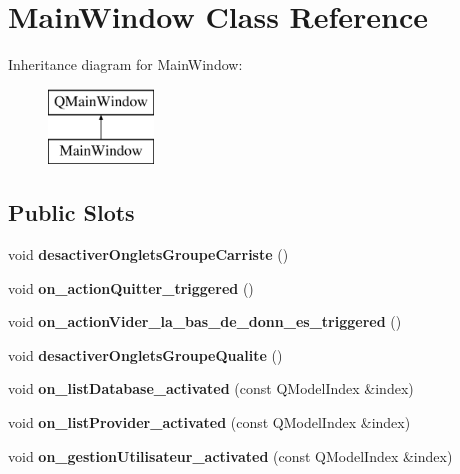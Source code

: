 \hypertarget{class_main_window}{}\section{Main\+Window Class Reference}
\label{class_main_window}
Inheritance diagram for Main\+Window\+:\begin{figure}[H]
\begin{center}
\leavevmode
\includegraphics[height=2.000000cm]{class_main_window}
\end{center}
\end{figure}
\subsection*{Public Slots}
\begin{DoxyCompactItemize}
\item 
\mbox{\label{class_main_window_a5b477f0785cfed5fdffcda39ad7b92cb}} 
void {\bfseries desactiver\+Onglets\+Groupe\+Carriste} ()
\item 
\mbox{\label{class_main_window_afe9d9d46e61e2460e636619577a9e8fd}} 
void {\bfseries on\+\_\+action\+Quitter\+\_\+triggered} ()
\item 
\mbox{\label{class_main_window_af416c87932d9675ef70ea737ad4b1a86}} 
void {\bfseries on\+\_\+action\+Vider\+\_\+la\+\_\+bas\+\_\+de\+\_\+donn\+\_\+es\+\_\+triggered} ()
\item 
\mbox{\label{class_main_window_a720083a9a815c386b46003d02b4034da}} 
void {\bfseries desactiver\+Onglets\+Groupe\+Qualite} ()
\item 
\mbox{\label{class_main_window_a37382033fa3cefb818a17d198707abe1}} 
void {\bfseries on\+\_\+list\+Database\+\_\+activated} (const Q\+Model\+Index \&index)
\item 
\mbox{\label{class_main_window_a5c37de425b15bf9117aae7b6b67df243}} 
void {\bfseries on\+\_\+list\+Provider\+\_\+activated} (const Q\+Model\+Index \&index)
\item 
\mbox{\label{class_main_window_a9c3a8c1df5ed2f93b79333aeab5a3323}} 
void {\bfseries on\+\_\+gestion\+Utilisateur\+\_\+activated} (const Q\+Model\+Index \&index)
\end{DoxyCompactItemize}
